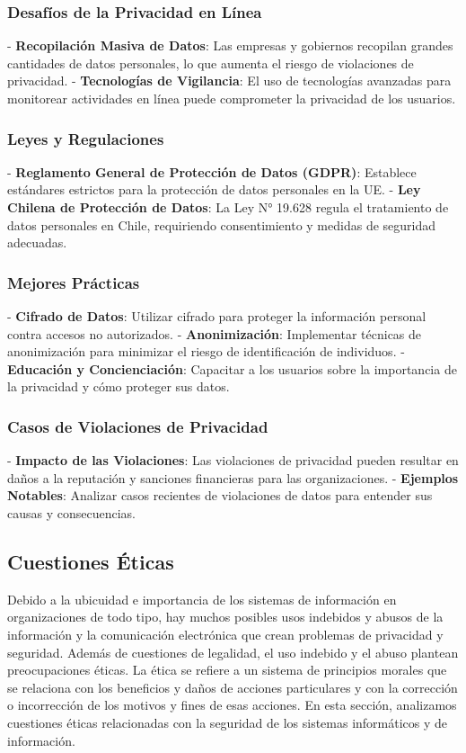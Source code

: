 \subsubsection{Desafíos de la Privacidad en Línea}
- \textbf{Recopilación Masiva de Datos}: Las empresas y gobiernos recopilan grandes cantidades de datos personales, lo que aumenta el riesgo de violaciones de privacidad.
- \textbf{Tecnologías de Vigilancia}: El uso de tecnologías avanzadas para monitorear actividades en línea puede comprometer la privacidad de los usuarios.

\subsubsection{Leyes y Regulaciones}
- \textbf{Reglamento General de Protección de Datos (GDPR)}: Establece estándares estrictos para la protección de datos personales en la UE.
- \textbf{Ley Chilena de Protección de Datos}: La Ley N° 19.628 regula el tratamiento de datos personales en Chile, requiriendo consentimiento y medidas de seguridad adecuadas.

\subsubsection{Mejores Prácticas}
- \textbf{Cifrado de Datos}: Utilizar cifrado para proteger la información personal contra accesos no autorizados.
- \textbf{Anonimización}: Implementar técnicas de anonimización para minimizar el riesgo de identificación de individuos.
- \textbf{Educación y Concienciación}: Capacitar a los usuarios sobre la importancia de la privacidad y cómo proteger sus datos.

\subsubsection{Casos de Violaciones de Privacidad}
- \textbf{Impacto de las Violaciones}: Las violaciones de privacidad pueden resultar en daños a la reputación y sanciones financieras para las organizaciones.
- \textbf{Ejemplos Notables}: Analizar casos recientes de violaciones de datos para entender sus causas y consecuencias.

\subsection{Cuestiones Éticas}
Debido a la ubicuidad e importancia de los sistemas de información en organizaciones de todo tipo, hay muchos posibles usos indebidos y abusos de la información y la comunicación electrónica que crean problemas de privacidad y seguridad. Además de cuestiones de legalidad, el uso indebido y el abuso plantean preocupaciones éticas. La ética se refiere a un sistema de principios morales que se relaciona con los beneficios y daños de acciones particulares y con la corrección o incorrección de los motivos y fines de esas acciones. En esta sección, analizamos cuestiones éticas relacionadas con la seguridad de los sistemas informáticos y de información.

